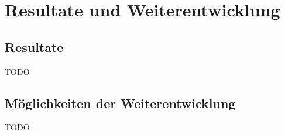 
\section{Resultate und Weiterentwicklung}
\label{sec:Resultate und Weiterentwicklung}

\subsection{Resultate}
\label{sub:Resultate}

TODO

\subsection{Möglichkeiten der Weiterentwicklung}
\label{sub:Möglichkeiten der Weiterentwicklung}

TODO